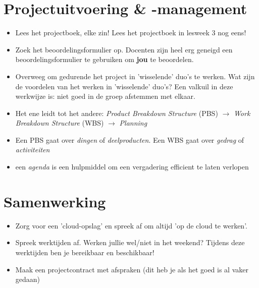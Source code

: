 \documentclass[24pt,a4paper]{article}
\begin{document}
\section{Projectuitvoering \& -management}
\begin{itemize}
      \item Lees het projectboek, elke zin! Lees het projectboek in lesweek 3 nog eens!
      \item Zoek het beoordelingsformulier op.
            Docenten zijn heel erg geneigd een beoordelingsformulier te gebruiken om \textbf{jou} te beoordelen.
      \item Overweeg om gedurende het project in 'wisselende' duo's te werken.
            Wat zijn de voordelen van het werken in 'wisselende' duo's?
            Een valkuil in deze werkwijze is: niet goed in de groep afstemmen met elkaar.
      \item Het ene leidt tot het andere: \textit{Product Breakdown Structure} (PBS) \textbf{$\rightarrow$} \textit{Work Breakdown Structure} (WBS)
            $\rightarrow$ \textit{Planning}
      \item Een PBS gaat over \textit{dingen} of \textit{deelproducten}. Een WBS gaat over \textit{gedrag} of \textit{activiteiten}
      \item een \textit{agenda} is een hulpmiddel om een vergadering efficient te laten verlopen
\end{itemize}


\section{Samenwerking}
\begin{itemize}
      \item Zorg voor een 'cloud-opslag' en spreek af om altijd 'op de cloud te werken'.
      \item Spreek werktijden af. Werken jullie wel/niet in het weekend? Tijdens deze werktijden ben je bereikbaar en beschikbaar!
      \item Maak een projectcontract met afspraken (dit heb je als het goed is al vaker gedaan)
\end{itemize}
\end{document}
